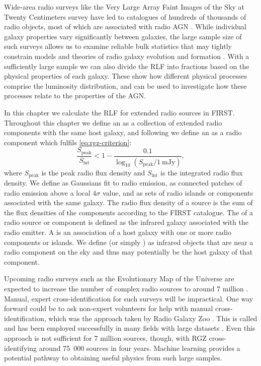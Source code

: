 Wide-area radio surveys like the Very Large Array Faint Images of the Sky at
Twenty Centimeters survey \citep[FIRST;][]{white97first} have led to
catalogues of hundreds of thousands of radio objects, most of which are
associated with radio AGN \citep{sadler02rlf}. While individual galaxy
properties vary significantly between galaxies, the large sample size of
such surveys allows us to examine reliable bulk statistics that may
tightly constrain models and theories of radio galaxy evolution and formation \citep{condon92radio}. With a
sufficiently large sample \citep[of size $N$ such that $N \gg
\sqrt{N}$;][]{condon91rlf} we can also divide the RLF into fractions based
on the physical properties of each galaxy. These  show
how different physical processes comprise the luminosity distribution, and
can be used to investigate how these processes relate to the properties of
the AGN.

In this chapter we calculate the RLF for extended radio sources in FIRST. Throughout this chapter we define an  as a collection of extended radio components with the same host galaxy, and following
\citet{banfield15} we define an  as a radio
component which fulfils \autoref{eq:rgz-criterion}:
\begin{equation}
    \frac{S_{\mathrm{peak}}}{S_{\mathrm{int}}} < 1 - \frac{0.1}{\log_{10}(S_{\mathrm{peak}} / 1\ \mathrm{mJy})},
    \label{eq:rgz-criterion}
\end{equation}
where $S_{\mathrm{peak}}$ is the peak radio flux density and
$S_{\mathrm{int}}$ is the integrated radio flux density. We define  as Gaussians fit to
radio emission,  as connected patches of radio emission
above a local $4\sigma$ value, and  as sets of radio
islands or components associated with the same galaxy. The radio flux density of a source is the sum of the flux densities of the components according to the FIRST catalogue. The  of a radio source or component is defined as the infrared galaxy
associated with the radio emitter. A  is an
association of a host galaxy with one or more radio components or islands. We
define  (or simply
) as infrared objects that are near a radio component on
the sky and thus may potentially be the host galaxy of that component.

Upcoming
radio surveys such as the Evolutionary Map of the Universe
\citep[EMU;][]{norris11} are expected to increase the number
of complex radio sources to around 7 million \citep{banfield15}. Manual, expert cross-identification for such surveys will be impractical. One way forward could be to ask non-expert volunteers for help with manual cross-identification, which was the approach taken by Radio Galaxy Zoo \citep[RGZ;][]{banfield15}. This is called  and has been employed successfully in many fields with large datasets \citep{marshall15citizen}. Even this approach is not sufficient for 7 million sources, though, with RGZ cross-identifying around 75~000 sources in four years. Machine
learning provides a potential pathway to obtaining useful physics from such
large samples.

